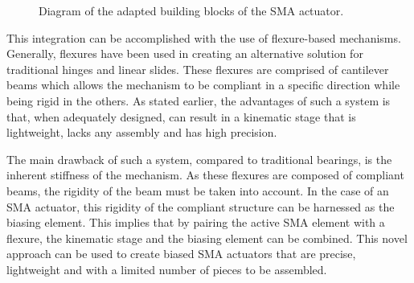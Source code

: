 \begin{figure}[h] %
  \centering
  \caption{Diagram of the adapted building blocks of the SMA actuator.}
  \label{fig:building-blocks-pt}
\end{figure}

This integration can be accomplished with the use of flexure-based mechanisms. Generally, flexures have been used in creating an alternative solution for traditional hinges and linear slides. These flexures are comprised of cantilever beams which allows the mechanism to be compliant in a specific direction while being rigid in the others. As stated earlier, the advantages of such a system is that, when adequately designed, can result in a kinematic stage that is lightweight, lacks any assembly and has high precision.


The main drawback of such a system, compared to traditional bearings, is the inherent stiffness of the mechanism. As these flexures are composed of compliant beams, the rigidity of the beam must be taken into account. In the case of an SMA actuator, this rigidity of the compliant structure can be harnessed as the biasing element. This implies that by pairing the active SMA element with a flexure, the kinematic stage and the biasing element can be combined. This novel approach can be used to create biased SMA actuators that are precise, lightweight and with a limited number of pieces to be assembled.

